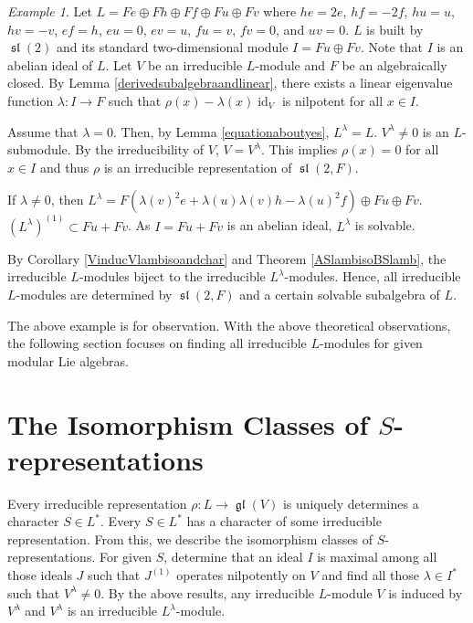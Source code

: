 \documentclass[12pt,MSc]{muthesis_2023}
\theoremstyle{plain}%
\theoremstyle{definition}
\theoremstyle{remark}
\newtheorem{Example}[FactCounter]{Example} %
\DeclareMathOperator{\gl}{\mathfrak{gl}}
\DeclareMathOperator{\Sl}{\mathfrak{sl}}
\DeclareMathOperator{\id}{id}
\begin{document}
\begin{Example}
Let $L=Fe\oplus Fh\oplus Ff\oplus Fu\oplus Fv$ where $he=2e$, $hf=-2f$, $hu=u$, $hv=-v$, $ef=h$, $eu=0$, $ev=u$, $fu=v$, $fv=0$, and $uv=0$. $L$ is built by $\Sl(2)$ and its standard two-dimensional module $I=Fu\oplus Fv$. Note that $I$ is an abelian ideal of $L$. Let $V$ be an irreducible $L$-module and $F$ be an algebraically closed. By Lemma \ref{derivedsubalgebraandlinear}, there exists a linear eigenvalue function $\lambda: I \rightarrow F$ such that $\rho(x)-\lambda(x)\id_V$ is nilpotent for all $x\in I$.

Assume that $\lambda=0$. Then, by Lemma \ref{equationaboutyes}, $L^{\lambda}=L$. $V^{\lambda}\neq0$ is an $L$-submodule. By the irreducibility of $V$, $V=V^{\lambda}$. This implies $\rho(x)=0$ for all $x\in I$ and thus $\rho$ is an irreducible representation of $\Sl(2,F)$.

If $\lambda\neq0$, then $L^{\lambda}=F({\lambda(v)}^2e+\lambda(u)\lambda(v)h-{\lambda(u)}^2f)\oplus Fu\oplus Fv$. $(L^{\lambda})^{(1)}\subset Fu+Fv$. As $I=Fu+Fv$ is an abelian ideal, $L^{\lambda}$ is solvable.
\end{Example}

By Corollary \ref{VinducVlambisoandchar} and Theorem \ref{ASlambisoBSlamb}, the irreducible $L$-modules biject to the irreducible $L^{\lambda}$-modules. Hence, all irreducible $L$-modules are determined by $\Sl(2,F)$ and a certain solvable subalgebra of $L$.

The above example is for observation. With the above theoretical observations, the following section focuses on finding all irreducible $L$-modules for given modular Lie algebras. 

\section{The Isomorphism Classes of $S$-representations}

Every irreducible representation $\rho:L \rightarrow \gl(V)$ is uniquely determines a character $S\in L^*$. Every $S\in L^*$ has a character of some irreducible representation. From this, we describe the isomorphism classes of $S$-representations. For given $S$, determine that an ideal $I$ is maximal among all those ideals $J$ such that $J^{(1)}$ operates nilpotently on $V$ and find all those $\lambda\in I^*$ such that $V^{\lambda}\neq0$. By the above results, any irreducible $L$-module $V$ is induced by $V^{\lambda}$ and $V^{\lambda}$ is an irreducible $L^{\lambda}$-module.
\end{document}
